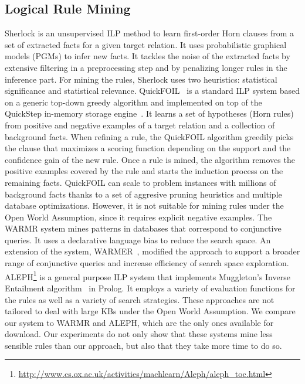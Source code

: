 \subsection{Logical Rule Mining}
Sherlock \cite{SchEtzWel10} is an unsupervised ILP method to learn first-order Horn clauses from a set of extracted facts for a given target relation. 
It uses probabilistic graphical models (PGMs) to infer new facts. 
It tackles the noise of the extracted  facts by extensive filtering in a preprocessing step and by penalizing longer rules in the inference part. 
For mining the rules, Sherlock uses two heuristics: statistical significance and statistical relevance. 
QuickFOIL~\cite{quickfoil} is a standard ILP system based on a generic top-down greedy algorithm and implemented 
on top of  the QuickStep in-memory storage engine~\cite{Chasseur:2013:DES:2536258.2536260}. It learns a set of hypotheses (Horn rules)
from positive and negative examples of a target relation and a collection of background facts. When refining a rule, the QuickFOIL algorithm 
greedily picks the clause that maximizes a scoring 
function depending on the support and the confidence gain of the new rule. Once a rule is mined, the algorithm removes the positive examples
covered by the rule and starts the induction process on the remaining facts.
QuickFOIL can scale to problem  instances with millions of background facts thanks to a 
set of aggresive pruning heuristics and multiple database optimizations. 
However, it is not suitable for mining rules under the Open World Assumption, since it requires explicit negative examples. 
The WARMR system \cite{DehToi99,DehToi00} mines patterns in data\-bases that correspond to conjunctive queries. It uses a declarative language bias to reduce the search space. 
An extension of the system, WARMER~\cite{GoeVan02}, modified the approach to support a broader range of conjunctive queries and increase efficiency of search space exploration. 
ALEPH\footnote{\label{foot:aleph}\url{http://www.cs.ox.ac.uk/activities/machlearn/Aleph/aleph_toc.html}} is a general purpose ILP system that implements Muggleton's Inverse Entailment algorithm~\cite{Muggleton95inverseentailment} in Prolog. 
It employs a variety of evaluation functions for the rules as well as a variety of search strategies. 
These approaches are not tailored to deal with large KBs under the Open World Assumption. 
We compare our system to WARMR and ALEPH, which are the only ones available for download. 
Our experiments do not only show that these systems mine less sensible rules than our approach, but also that they take more time to do so.

